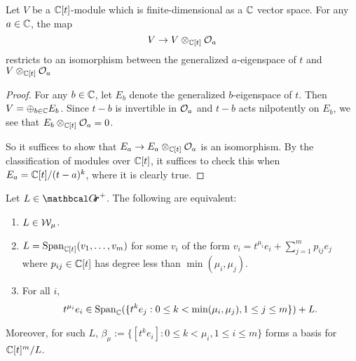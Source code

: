 \documentclass[draft]{article}
\begin{document}
\begin{lemma} 
\label{le:linalg} %
Let $ V $ be a $ \mathbb C[t]$-module which is finite-dimensional as a $ \mathbb C$ vector space.  For any  $ a \in \mathbb C$, the map
$$ 
    V  \rightarrow V \otimes_{\mathbb C[t]} \mathcal O_a
$$
restricts to an isomorphism between the generalized $ a $-eigenspace of $ t $ and $ V \otimes_{\mathbb C[t]} \mathcal O_a$
\end{lemma}
% 
\begin{proof}
    For any $ b \in \mathbb C$, let $ E_b $ denote the generalized $b$-eigenspace of $t$.  Then $ V = \oplus_{b \in \mathbb C} E_b$.  Since $ t - b$ is invertible in $ \mathcal O_a$ and $ t -b $ acts nilpotently on $ E_b$, we see that $ E_b \otimes_{\mathbb C[t]} \mathcal O_a = 0 $.
    
    So it suffices to show that $ E_a \rightarrow E_a \otimes_{\mathbb C[t]} \mathcal O_a$ is an isomorphism.  By the classification of modules over $ \mathbb C[t]$, it suffices to check this when  $ E_a = \mathbb C[t]/(t-a)^k$, where it is clearly true.
\end{proof}
% 
\begin{lemma} 
\label{le:Wmu}
Let $ L \in \Grth^+$.  The following are equivalent:
\begin{enumerate}
    \item $ L \in \mathcal W_\mu$.
            \item $ L = \operatorname{Span}_{\mathbb C[t]}(v_1, \dots, v_m)$ for some $ v_i $ of the form $ v_i = t^{\mu_i} e_i + \sum_{j=1}^m p_{ij} e_j $ where $ p_{ij} \in \mathbb C[t] $ has degree less than $ \min(\mu_i, \mu_j)$.
    \item  For all $ i $, 
    $$ t^{\mu_i} e_i \in \operatorname{Span}_\mathbb C(\{t^k e_j : 0 \le k < \min(\mu_i, \mu_j), 1 \le j \le m \}) + L. $$
\end{enumerate}
Moreover, for such $L $, $ \beta_\mu := \{ [t^k e_i] : 0 \le k < \mu_i, 1 \le i \le m\}$ forms a basis for $ \mathbb C[t]^m/L$. 
\end{lemma}
% 
% 
\end{document}
